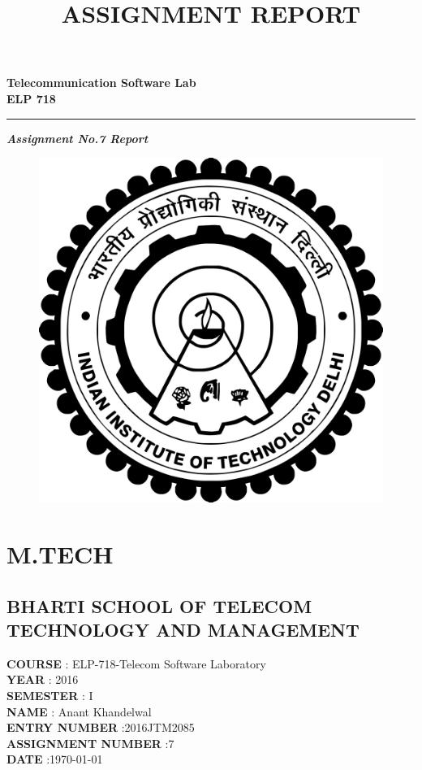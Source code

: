\documentclass[11pt]{article}
\title{\textbf{ASSIGNMENT REPORT}}
\date{}
\begin{document}
\begin{titlepage}
\centering
\vfill
\textbf{\Huge{Telecommunication Software Lab   %
\linebreak   %
\\ELP 718}}\\
\textcolor{red}{\rule{\textwidth}{3pt}}   %
\vskip 2cm
\textbf{\Large{{\emph{Assignment No.7 Report}}}}\\
\vskip 0.5cm
\begin{figure}[h]
\centering
\includegraphics[scale=0.04]{iitdlogo}
\end{figure}
\section*{\center M.TECH}
\subsection*{\center BHARTI SCHOOL OF TELECOM TECHNOLOGY AND MANAGEMENT}
\bigskip
\bigskip
\bigskip
\bigskip
\bigskip
\bigskip
\begin{center}
\textbf{COURSE} : ELP-718-Telecom Software Laboratory\\
\textbf{YEAR} : 2016 \\
\textbf{SEMESTER} : I \\
\textbf{NAME} : Anant Khandelwal\\
\textbf{ENTRY NUMBER} :2016JTM2085 \\
\textbf{ASSIGNMENT NUMBER} :7\\
\textbf{ DATE} :\today
\end{center}
\end{titlepage}
\newpage
\end{document}
